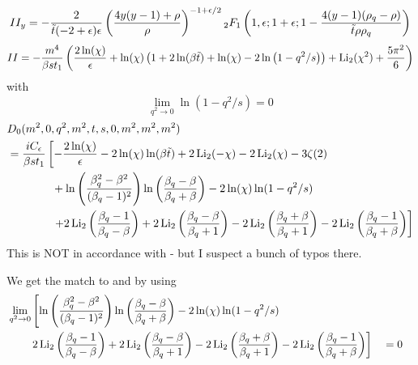 \begin{equation}
II_y = -\frac {2}{\tilde t(-2+\epsilon)\epsilon}\left(\frac{4y(y-1)+\rho}{\rho}\right)^{-1+\epsilon/2}{}_{2}F_{1} \left(1,\epsilon;1+\epsilon;1-\frac{4(y-1)(\rho_q-\rho)}{\tilde t \rho\rho_q}\right)
\end{equation}
\begin{equation}
II = -\frac{m^4}{\beta s t_1}\left(\frac{2\ln(\chi)}{\epsilon} +  \ln(\chi)\left(1+2\ln(\beta \tilde t)+\ln(\chi)-2\ln\left(1-q^2/s\right)\right)+\operatorname{\text{Li}_2}(\chi^2)+\frac{5\pi^2}{6}\right)
\end{equation}
with
\begin{equation}
\lim_{q^2\rightarrow 0}\ln(1-q^2/s)=0
\end{equation}
\begin{align}
&D_0(m^2,0,q^2,m^2,t,s,0,m^2,m^2,m^2)\nonumber\\
 &=\frac{i C_\epsilon}{\beta s t_1}\left[-\frac{2\ln(\chi)}{\epsilon} -2\ln(\chi)\ln(\beta\tilde t)+2\operatorname{\text{Li}_2}(-\chi)-2\operatorname{\text{Li}_2}(\chi)-3\zeta(2) \right.\nonumber\\
 &\hspace{40pt}+\ln\left(\frac{\beta_q^2-\beta^2}{(\beta_q-1)^2}\right)\ln\left(\frac{\beta_q-\beta}{\beta_q+\beta}\right)-2\ln(\chi)\ln(1-q^2/s)\nonumber\\
 &\hspace{40pt}\left. + 2\operatorname{\text{Li}_2}\left(\frac{\beta_q-1}{\beta_q-\beta}\right)+2\operatorname{\text{Li}_2}\left(\frac{\beta_q-\beta}{\beta_q+1}\right)-2\operatorname{\text{Li}_2}\left(\frac{\beta_q+\beta}{\beta_q+1}\right)-2\operatorname{\text{Li}_2}\left(\frac{\beta_q-1}{\beta_q+\beta}\right) \right]
\end{align}
This is NOT in accordance with \cite[eq. (A.3)]{Laenen1993162} - but I suspect a bunch of typos there.

We get the match to \cite{Bojak:2000eu} and \cite{PhysRevD.40.54} by using
\begin{align}
&\lim_{q^2\rightarrow 0}\left[\ln\left(\frac{\beta_q^2-\beta^2}{(\beta_q-1)^2}\right)\ln\left(\frac{\beta_q-\beta}{\beta_q+\beta}\right)-2\ln(\chi)\ln(1-q^2/s)\right.\nonumber\\
&\hspace{20pt}\left. 2\operatorname{\text{Li}_2}\left(\frac{\beta_q-1}{\beta_q-\beta}\right)+2\operatorname{\text{Li}_2}\left(\frac{\beta_q-\beta}{\beta_q+1}\right)-2\operatorname{\text{Li}_2}\left(\frac{\beta_q+\beta}{\beta_q+1}\right)-2\operatorname{\text{Li}_2}\left(\frac{\beta_q-1}{\beta_q+\beta}\right) \right]&&=0
\end{align}
